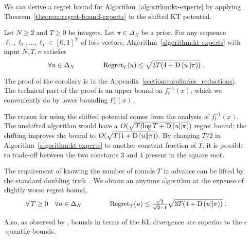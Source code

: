 We can derive a regret bound for Algorithm~\ref{algorithm:kt-experts} by
applying Theorem~\ref{theorem:regret-bound-experts} to the shifted KT potential.
\begin{corollary}
\label{corollary:kt-experts-regret}
Let $N \ge 2$ and $T \ge 0$ be integers. Let $\pi \in \Delta_N$ be a prior.
For any sequence $\ell_1, \ell_2, \dots, \ell_T \in
[0,1]^N$ of loss vectors, Algorithm~\ref{algorithm:kt-experts}
with input $N,T,\pi$ satisfies
\[
\forall u \in \Delta_N \qquad \qquad \operatorname{Regret}_T(u) \le \sqrt{3T (4 + \operatorname*{D}\left({u}\middle\|{\pi}\right))} \; .
\]
\end{corollary}
The proof of the corollary is in the Appendix~\ref{section:corollaries_reductions}.
The technical part of the proof is an upper bound on $f_t^{-1}(x)$, which we
conveniently do by lower bounding $F_t(x)$.

The reason for using the shifted
potential comes from the analysis of $f_t^{-1}(x)$. The unshifted algorithm would
have a $O(\sqrt{T (\log T + \operatorname*{D}\left({u}\middle\|{\pi}\right)})$ regret bound; the shifting improves the
bound to $O(\sqrt{T (1 + \operatorname*{D}\left({u}\middle\|{\pi}\right)})$.
By changing $T/2$ in Algorithm~\ref{algorithm:kt-experts} to another constant
fraction of $T$, it is possible to trade-off between the two constants $3$ and
$4$ present in the square root.

The requirement of knowing the number of rounds $T$ in advance can be lifted by
the standard doubling trick~\citep[Section 2.3.1]{Shalev-Shwartz12}. We obtain
an anytime algorithm at the expense of slightly worse regret bound,
\[
\forall \, T \ge 0 \quad \forall u \in \Delta_N \qquad \qquad
\operatorname{Regret}_T(u) \le \tfrac{\sqrt{2}}{\sqrt{2} - 1} \sqrt{3T (4 + \operatorname*{D}\left({u}\middle\|{\pi}\right))} \; .
\]

Also, as observed by \citet{ChernovV10}, bounds in terms of the KL
divergence are superior to the $\epsilon$-quantile bounds.
